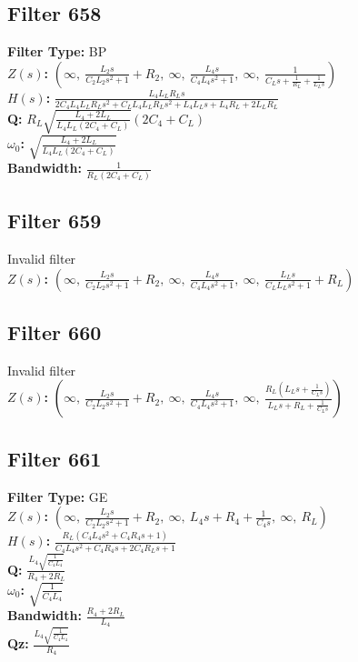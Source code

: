 \documentclass{article}
\begin{document}
\subsection*{Filter 658}
\textbf{Filter Type:} BP \\ 
\textbf{$Z(s)$:} $\left( \infty, \  \frac{L_{2} s}{C_{2} L_{2} s^{2} + 1} + R_{2}, \  \infty, \  \frac{L_{4} s}{C_{4} L_{4} s^{2} + 1}, \  \infty, \  \frac{1}{C_{L} s + \frac{1}{R_{L}} + \frac{1}{L_{L} s}}\right)$ \\ 
\textbf{$H(s)$:} $\frac{L_{4} L_{L} R_{L} s}{2 C_{4} L_{4} L_{L} R_{L} s^{2} + C_{L} L_{4} L_{L} R_{L} s^{2} + L_{4} L_{L} s + L_{4} R_{L} + 2 L_{L} R_{L}}$ \\ 
\textbf{Q:} $R_{L} \sqrt{\frac{L_{4} + 2 L_{L}}{L_{4} L_{L} \left(2 C_{4} + C_{L}\right)}} \left(2 C_{4} + C_{L}\right)$ \\ 
\textbf{$\omega_0$:} $\sqrt{\frac{L_{4} + 2 L_{L}}{L_{4} L_{L} \left(2 C_{4} + C_{L}\right)}}$ \\ 
\textbf{Bandwidth:} $\frac{1}{R_{L} \left(2 C_{4} + C_{L}\right)}$ \\ 
\subsection*{Filter 659}
Invalid filter \\ 
\textbf{$Z(s)$:} $\left( \infty, \  \frac{L_{2} s}{C_{2} L_{2} s^{2} + 1} + R_{2}, \  \infty, \  \frac{L_{4} s}{C_{4} L_{4} s^{2} + 1}, \  \infty, \  \frac{L_{L} s}{C_{L} L_{L} s^{2} + 1} + R_{L}\right)$ \\ 
\subsection*{Filter 660}
Invalid filter \\ 
\textbf{$Z(s)$:} $\left( \infty, \  \frac{L_{2} s}{C_{2} L_{2} s^{2} + 1} + R_{2}, \  \infty, \  \frac{L_{4} s}{C_{4} L_{4} s^{2} + 1}, \  \infty, \  \frac{R_{L} \left(L_{L} s + \frac{1}{C_{L} s}\right)}{L_{L} s + R_{L} + \frac{1}{C_{L} s}}\right)$ \\ 
\subsection*{Filter 661}
\textbf{Filter Type:} GE \\ 
\textbf{$Z(s)$:} $\left( \infty, \  \frac{L_{2} s}{C_{2} L_{2} s^{2} + 1} + R_{2}, \  \infty, \  L_{4} s + R_{4} + \frac{1}{C_{4} s}, \  \infty, \  R_{L}\right)$ \\ 
\textbf{$H(s)$:} $\frac{R_{L} \left(C_{4} L_{4} s^{2} + C_{4} R_{4} s + 1\right)}{C_{4} L_{4} s^{2} + C_{4} R_{4} s + 2 C_{4} R_{L} s + 1}$ \\ 
\textbf{Q:} $\frac{L_{4} \sqrt{\frac{1}{C_{4} L_{4}}}}{R_{4} + 2 R_{L}}$ \\ 
\textbf{$\omega_0$:} $\sqrt{\frac{1}{C_{4} L_{4}}}$ \\ 
\textbf{Bandwidth:} $\frac{R_{4} + 2 R_{L}}{L_{4}}$ \\ 
\textbf{Qz:} $\frac{L_{4} \sqrt{\frac{1}{C_{4} L_{4}}}}{R_{4}}$ \\ 
\end{document}
